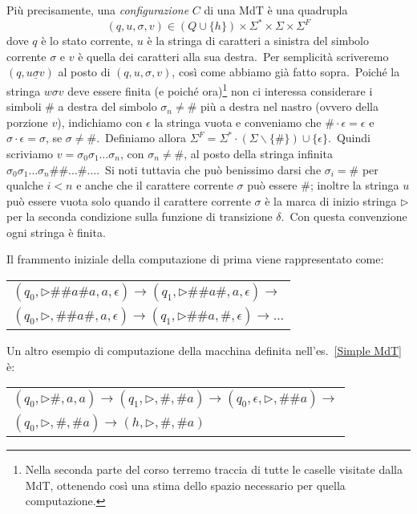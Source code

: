 \noindent Più precisamente, una \textit{configurazione} $C$ di una MdT è una quadrupla
\[(q,u,\sigma,v) \in (Q \cup \{h\}) \times \Sigma^* \times \Sigma \times \Sigma^F\]
dove $q$ è lo stato corrente, $u$ è la stringa di caratteri a sinistra del simbolo corrente $\sigma$ e $v$ è quella dei caratteri alla sua destra.\
Per semplicità scriveremo $(q, u\underline{\sigma}v)$ al posto di $(q,u,\sigma,v)$, così come abbiamo già fatto sopra.\
Poiché la stringa $w\sigma v$ deve essere finita (e poiché ora)\footnote{Nella seconda parte del corso terremo traccia di tutte le caselle visitate dalla MdT, ottenendo così una stima dello spazio necessario per quella computazione.} non ci interessa considerare i simboli \# a destra del simbolo $\sigma_n \neq \#$ più a destra nel nastro (ovvero della porzione $v$), indichiamo con $\epsilon$ la stringa vuota e conveniamo che $\# \cdot \epsilon = \epsilon$ e $\sigma \cdot \epsilon = \sigma$, se $\sigma \neq \#$.\
Definiamo allora $\Sigma^F = \Sigma^* \cdot (\Sigma \backslash \{\#\}) \cup \{\epsilon\}$.\
Quindi scriviamo $v = \sigma_0\sigma_1\dots\sigma_n$, con $\sigma_n \neq \#$, al posto della stringa infinita $\sigma_0\sigma_1\dots\sigma_n\#\#\dots\#\dots$.\
Si noti tuttavia che può benissimo darsi che $\sigma_i = \#$ per qualche $i<n$ e anche che il carattere corrente $\sigma$ può essere \#; inoltre la stringa $u$ può essere vuota solo quando il carattere corrente $\sigma$ è la marca di inizio stringa $\triangleright$ per la seconda condizione sulla funzione di transizione $\delta$.\
Con questa convenzione ogni stringa è finita.

\vspace{12 pt}

\noindent Il frammento iniziale della computazione di prima viene rappresentato come:
\begin{table}[H]
    \begin{tabular}{l}
        $(q_0, \triangleright\#\#a\#a, a, \epsilon) \rightarrow (q_1, \triangleright\#\#a\#, a,\epsilon) \rightarrow$      \\
        $(q_0, \triangleright, \#\#a\#, a,\epsilon) \rightarrow (q_1, \triangleright\#\#a, \#,\epsilon) \rightarrow \dots$ \\
    \end{tabular}
\end{table}

\noindent Un altro esempio di computazione della macchina definita nell'es.\ \ref{Simple MdT} è:
\begin{table}[H]
    \begin{tabular}{l}
        $(q_0, \triangleright\#, a, a) \rightarrow (q_1, \triangleright, \#, \#a) \rightarrow (q_0, \epsilon, \triangleright, \#\#a) \rightarrow$ \\
        $(q_0, \triangleright, \#, \#a) \rightarrow (h, \triangleright, \#, \#a)$                                                                 \\
    \end{tabular}
\end{table}

